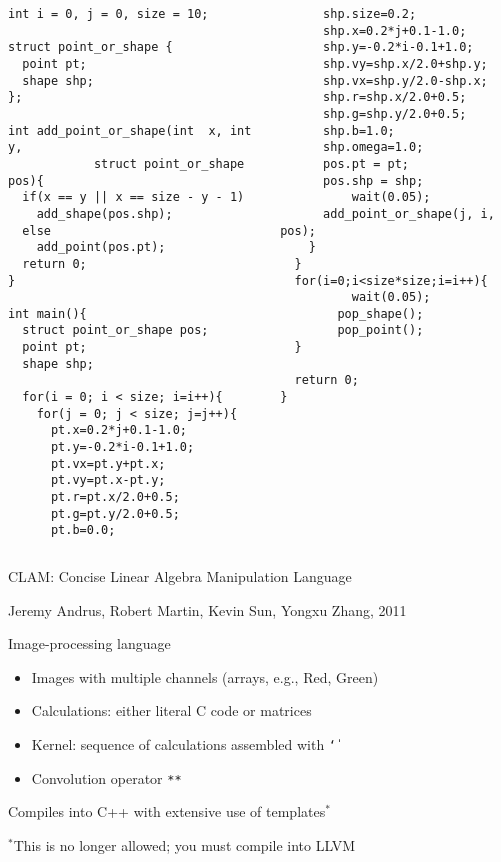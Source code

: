 \documentclass{plt}
\begin{document}
\begin{frame}[fragile]
\begin{columns}
\begin{column}{0.5\textwidth}
\fontsize{8pt}{8pt}\selectfont
\begin{verbatim}
int i = 0, j = 0, size = 10;

struct point_or_shape {
  point pt;
  shape shp;
};

int add_point_or_shape(int  x, int y,
            struct point_or_shape pos){
  if(x == y || x == size - y - 1)
    add_shape(pos.shp);
  else
    add_point(pos.pt);
  return 0;
}

int main(){
  struct point_or_shape pos;
  point pt;
  shape shp;

  for(i = 0; i < size; i=i++){
    for(j = 0; j < size; j=j++){
      pt.x=0.2*j+0.1-1.0;
      pt.y=-0.2*i-0.1+1.0;
      pt.vx=pt.y+pt.x;
      pt.vy=pt.x-pt.y;
      pt.r=pt.x/2.0+0.5;
      pt.g=pt.y/2.0+0.5;
      pt.b=0.0;
\end{verbatim}
\end{column}
\begin{column}{0.5\textwidth}
\fontsize{8pt}{8pt}\selectfont
\begin{verbatim}
      shp.size=0.2;
      shp.x=0.2*j+0.1-1.0;
      shp.y=-0.2*i-0.1+1.0;
      shp.vy=shp.x/2.0+shp.y;
      shp.vx=shp.y/2.0-shp.x;
      shp.r=shp.x/2.0+0.5;
      shp.g=shp.y/2.0+0.5;
      shp.b=1.0;
      shp.omega=1.0;
      pos.pt = pt;
      pos.shp = shp;
          wait(0.05);
      add_point_or_shape(j, i, pos);
    }
  }
  for(i=0;i<size*size;i=i++){
          wait(0.05);
        pop_shape();
        pop_point();
  }
 
  return 0;
}
\end{verbatim}
\end{column}
\end{columns}
\end{frame}

\begin{frame}{CLAM: Concise Linear Algebra Manipulation Language}

{\small Jeremy Andrus, Robert Martin, Kevin Sun, Yongxu Zhang, 2011}

Image-processing language

\begin{itemize}
\item Images with multiple channels (arrays, e.g., Red, Green)
\item Calculations: either literal C code or matrices
\item Kernel: sequence of calculations assembled with \texttt{\char`\|}
\item Convolution operator \texttt{**}
\end{itemize}

Compiles into C++ with extensive use of templates$^*$

$^*$This is no longer allowed; you must compile into LLVM

\end{frame}
\end{document}
